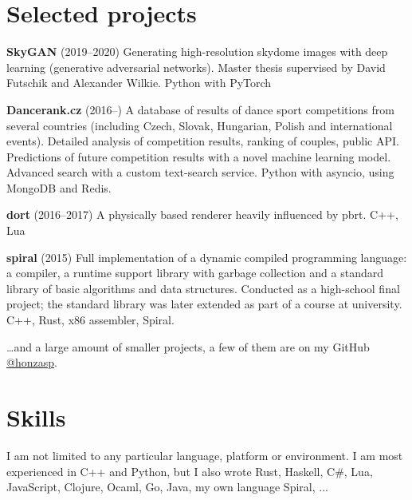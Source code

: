 \documentclass[11pt,a4paper]{article}
\begin{document}
\begin{multicols}{2}
\section*{Selected projects}

\textbf{SkyGAN} (2019–2020)
  \newline Generating high-resolution skydome images with deep learning
  (generative adversarial networks).
  \newline Master thesis supervised by David Futschik and Alexander Wilkie.
  \newline Python with PyTorch

\textbf{Dancerank.cz} (2016–)
  \newline A database of results of dance sport competitions from several
  countries (including Czech, Slovak, Hungarian, Polish and international
  events).
  \newline Detailed analysis of competition results, ranking of couples, public API.
  \newline Predictions of future competition results with a novel machine learning model.
  \newline Advanced search with a custom text-search service.
  \newline Python with asyncio, using MongoDB and Redis.

\textbf{dort} (2016–2017)
  \newline A physically based renderer heavily influenced by pbrt.
  \newline C++, Lua

\textbf{spiral} (2015)
  \newline Full implementation of a dynamic compiled programming language: a
  compiler, a runtime support library with garbage collection and a standard
  library of basic algorithms and data structures.
  \newline Conducted as a high-school final project; the standard library was
  later extended as part of a course at university.
  \newline C++, Rust, x86 assembler, Spiral.

\ldots{}and a large amount of smaller projects, a few of them are on my GitHub 
\href{https://github.com/honzasp}{@honzasp}.

\section*{Skills}

I am not limited to any particular language, platform or environment. I am most
experienced in C++ and Python, but I also wrote Rust,
{\small Haskell, C\#, Lua,}
{\footnotesize JavaScript,}
{\scriptsize Clojure, Ocaml, Go, Java, my own language Spiral, ...}


\end{multicols}
\end{document}
